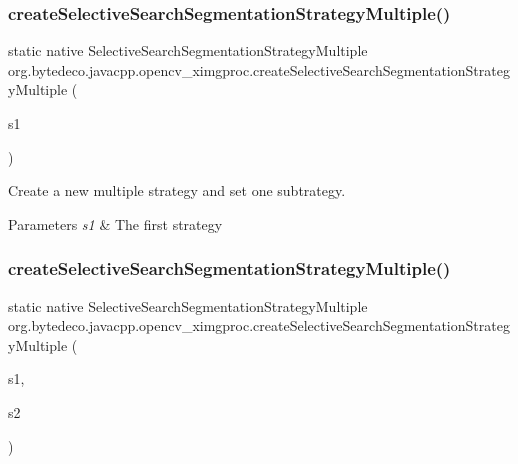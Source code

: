 \subsubsection{\texorpdfstring{create\+Selective\+Search\+Segmentation\+Strategy\+Multiple()}{createSelectiveSearchSegmentationStrategyMultiple()}\hspace{0.1cm}{\footnotesize\ttfamily [1/4]}}
{\footnotesize\ttfamily static native Selective\+Search\+Segmentation\+Strategy\+Multiple org.\+bytedeco.\+javacpp.\+opencv\+\_\+ximgproc.\+create\+Selective\+Search\+Segmentation\+Strategy\+Multiple (\begin{DoxyParamCaption}\item[{@Ptr Selective\+Search\+Segmentation\+Strategy}]{s1 }\end{DoxyParamCaption})\hspace{0.3cm}{\ttfamily [static]}}



Create a new multiple strategy and set one subtrategy. 


\begin{DoxyParams}{Parameters}
{\em s1} & The first strategy \\
\hline
\end{DoxyParams}
\mbox{\label{group__ximgproc__segmentation_gaf769336116a86e1107367e971033e25b}} 
\subsubsection{\texorpdfstring{create\+Selective\+Search\+Segmentation\+Strategy\+Multiple()}{createSelectiveSearchSegmentationStrategyMultiple()}\hspace{0.1cm}{\footnotesize\ttfamily [2/4]}}
{\footnotesize\ttfamily static native Selective\+Search\+Segmentation\+Strategy\+Multiple org.\+bytedeco.\+javacpp.\+opencv\+\_\+ximgproc.\+create\+Selective\+Search\+Segmentation\+Strategy\+Multiple (\begin{DoxyParamCaption}\item[{@Ptr Selective\+Search\+Segmentation\+Strategy}]{s1,  }\item[{@Ptr Selective\+Search\+Segmentation\+Strategy}]{s2 }\end{DoxyParamCaption})\hspace{0.3cm}{\ttfamily [static]}}



